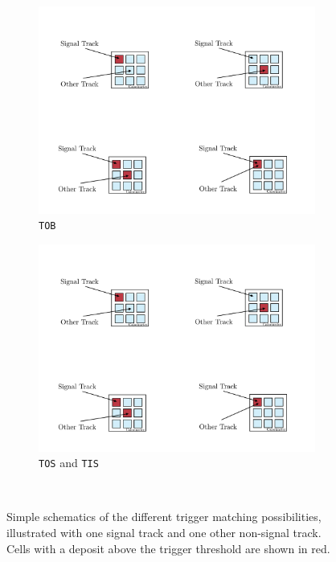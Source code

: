 \begin{figure}[!h]
\begin{subfigure}[t]{0.4\textwidth}
        \includegraphics[width=1.0\textwidth]{figs/Selection/Tob.pdf}
        \caption{\texttt{TOB}}
    \end{subfigure}
    \begin{subfigure}[t]{0.4\textwidth}
        \includegraphics[width=1.0\textwidth]{figs/Selection/TisTos.pdf}
        \caption{\texttt{TOS} and \texttt{TIS}}
    \end{subfigure}\\
    \caption{Simple schematics of the different trigger matching possibilities, illustrated with one signal track and one other non-signal track. Cells with a deposit above the trigger threshold are shown in red. }
    \label{fig:tistostobbing}   
\end{figure}


